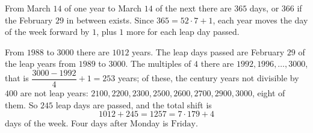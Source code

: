 From March $14$ of one year to March $14$ of the next there are $365$ days, or $366$ if the February $29$ in between exists. Since $365=52\cdot7+1$, each year moves the day of the week forward by $1$, plus $1$ more for each leap day passed.

From $1988$ to $3000$ there are $1012$ years. The leap days passed are February $29$ of the leap years from $1989$ to $3000$. The multiples of $4$ there are $1992,1996,\dots,3000$, that is $\dfrac{3000-1992}{4}+1=253$ years; of these, the century years not divisible by $400$ are not leap years: $2100,2200,2300,2500,2600,2700,2900,3000$, eight of them. So $245$ leap days are passed, and the total shift is
\[1012+245=1257=7\cdot179+4\]
days of the week. Four days after Monday is $\boxed{\text{Friday}}$.
